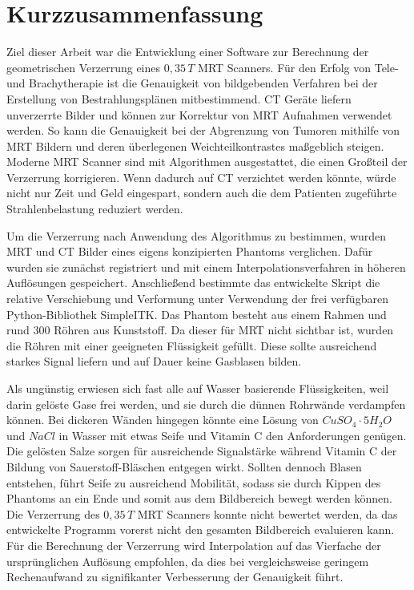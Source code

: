 

\chapter*{Kurzzusammenfassung}
Ziel dieser Arbeit war die Entwicklung einer Software zur Berechnung der geometrischen Verzerrung eines $0,35\, T$ MRT Scanners.
Für den Erfolg von Tele- und Brachytherapie ist die Genauigkeit von bildgebenden Verfahren bei der Erstellung von Bestrahlungsplänen mitbestimmend.
CT Geräte liefern unverzerrte Bilder und können zur Korrektur von MRT Aufnahmen verwendet werden.
So kann die Genauigkeit bei der Abgrenzung von Tumoren mithilfe von MRT Bildern und deren überlegenen Weichteilkontrastes maßgeblich steigen.
Moderne MRT Scanner sind mit Algorithmen ausgestattet, die einen Großteil der Verzerrung korrigieren.
Wenn dadurch auf CT verzichtet werden könnte, würde nicht nur Zeit und Geld eingespart, sondern auch die dem Patienten zugeführte Strahlenbelastung reduziert werden.

Um die Verzerrung nach Anwendung des Algorithmus zu bestimmen, wurden MRT und CT Bilder eines eigens konzipierten Phantoms verglichen.
Dafür wurden sie zunächst registriert und mit einem Interpolationsverfahren in höheren Auflösungen gespeichert.
Anschließend bestimmte das entwickelte Skript die relative Verschiebung und Verformung unter Verwendung der frei verfügbaren Python-Bibliothek SimpleITK.
Das Phantom besteht aus einem Rahmen und rund 300 Röhren aus Kunststoff.
Da dieser für MRT nicht sichtbar ist, wurden die Röhren mit einer geeigneten Flüssigkeit gefüllt.
Diese sollte ausreichend starkes Signal liefern und auf Dauer keine Gasblasen bilden.

Als ungünstig erwiesen sich fast alle auf Wasser basierende Flüssigkeiten, weil darin gelöste Gase frei werden, und sie durch die dünnen Rohrwände verdampfen können.
Bei dickeren Wänden hingegen könnte eine Lösung von $CuSO_4\cdot5H_2O$ und $NaCl$ in Wasser mit etwas Seife und Vitamin C den Anforderungen genügen.
Die gelösten Salze sorgen für ausreichende Signalstärke während Vitamin C der Bildung von Sauerstoff-Bläschen entgegen wirkt.
Sollten dennoch Blasen entstehen, führt Seife zu ausreichend Mobilität, sodass sie durch Kippen des Phantoms an ein Ende und somit aus dem Bildbereich bewegt werden können.
Die Verzerrung des $0,35\, T$ MRT Scanners konnte nicht bewertet werden, da das entwickelte Programm vorerst nicht den gesamten Bildbereich evaluieren kann.
Für die Berechnung der Verzerrung wird Interpolation auf das Vierfache der ursprünglichen Auflösung empfohlen, da dies bei vergleichsweise geringem Rechenaufwand zu signifikanter Verbesserung der Genauigkeit führt.

